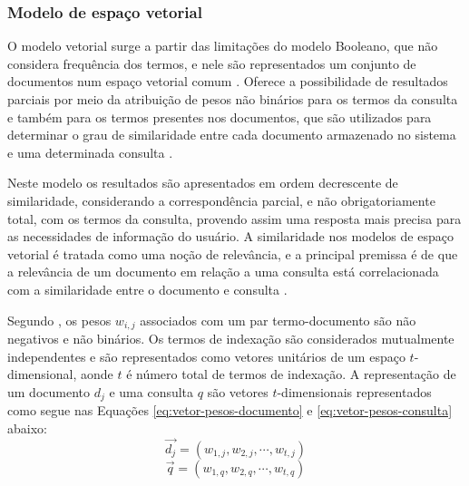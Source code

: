     \subsubsection{Modelo de espaço vetorial} \label{subsubsec:Modelo-espaço-vetorial}
    
    
    
        O modelo vetorial surge a partir das limitações do modelo Booleano, que não considera frequência dos termos, e nele são representados um conjunto de documentos num espaço vetorial comum \cite[p.~110]{Manning2008IIR}.
        Oferece a possibilidade de resultados parciais por meio da atribuição de pesos não binários para os termos da consulta e também para os termos presentes nos documentos, que são utilizados para determinar o grau de similaridade entre cada documento armazenado no sistema e uma determinada consulta \cite[p.~77]{Baeza-Yates2011}.
        
        Neste modelo os resultados são apresentados em ordem decrescente de similaridade, considerando a correspondência parcial, e não obrigatoriamente total, com os termos da consulta, provendo assim uma resposta mais precisa para as necessidades de informação do usuário.
        A similaridade nos modelos de espaço vetorial é tratada como uma noção de relevância, e a principal premissa é de que a relevância de um documento em relação a uma consulta está correlacionada com a similaridade entre o documento e consulta \cite[p.~110]{Zhai2016TDMA}.
        
        Segundo , os pesos $w_{i,j}$ associados com um par termo-documento são não negativos e não binários.
        Os termos de indexação são considerados mutualmente independentes e são representados como vetores unitários de um espaço $t$-dimensional, aonde $t$ é número total de termos de indexação.
        A representação de um documento $d_j$ e uma consulta $q$ são vetores $t$-dimensionais representados como segue nas Equações \ref{eq:vetor-pesos-documento} e \ref{eq:vetor-pesos-consulta} abaixo:
        \begin{equation}
            \label{eq:vetor-pesos-documento}
    		\vec{d_j} = (w_{1,j}, w_{2,j}, \cdots , w_{t,j})
        \end{equation}
        \begin{equation}
            \label{eq:vetor-pesos-consulta}
    		\vec{q} = (w_{1,q}, w_{2,q}, \cdots , w_{t,q})
        \end{equation}
        
